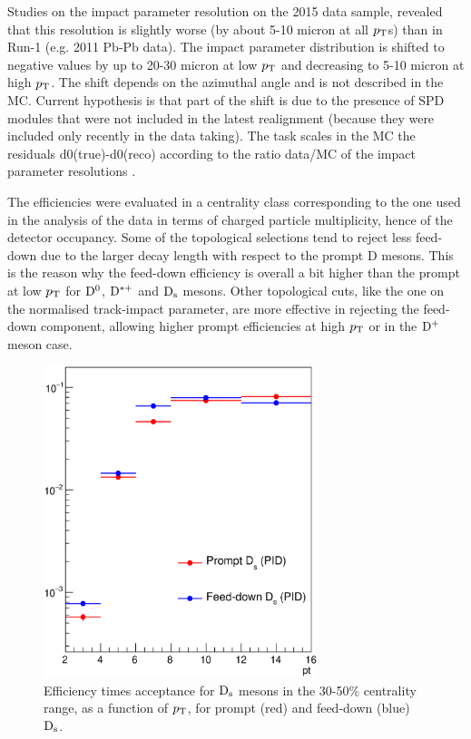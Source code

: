 Studies on the impact parameter resolution on the 2015 data sample, revealed that this resolution is slightly worse (by about 5-10 micron at all $p_{\rm T}$s) than in Run-1 (e.g. 2011 Pb-Pb data).
The impact parameter distribution is shifted to negative values by up to 20-30 micron at low $p_{\rm T}$ and decreasing to 5-10 micron at high $p_{\rm T}$. The shift depends on the azimuthal angle and is not described in the MC. Current hypothesis is that part of the shift is due to the presence of SPD modules that were not included in the latest realignment (because they were included only recently in the data taking). The task scales in the MC the residuals d0(true)-d0(reco) according to the ratio data/MC of the impact parameter resolutions .


The efficiencies were evaluated in a centrality class corresponding to the one used in the analysis of the data in terms of charged particle 
multiplicity, hence of the detector occupancy.
Some of the topological selections tend to reject less feed-down due to the larger 
decay length with respect to the prompt D mesons. This is the reason why the feed-down 
efficiency is overall a bit higher than the prompt at low $p_{\rm T}$ for ${\rm D^0}$, ${\rm D^{*+}}$ and ${\rm D_s}$ mesons.
Other topological cuts, like the one on the normalised track-impact parameter, are more effective
in rejecting the feed-down component, allowing higher prompt efficiencies at high $p_{\rm T}$ or in the ${\rm D^+}$ meson case.

\begin{figure}[!t]
\centering
\includegraphics[width=8cm]{FigCap5/DsAccEff_3050.eps}
\caption{Efficiency times acceptance for ${\rm D_s}$ mesons in the 30-50\% centrality range, as a function of $p_{\rm T}$, for prompt (red) and feed-down (blue) ${\rm D_s}$.}
\label{fig:DsAccEff}
\end{figure}


